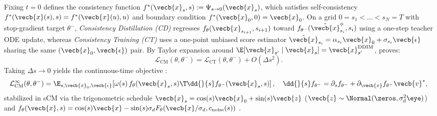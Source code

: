\documentclass[../../../../master.tex]{subfiles}
\begin{document}
\begin{coremath}
Fixing $t=0$ defines the consistency function $f^*(\vecb{x}_s, s) := \Psi_{s\to 0}(\vecb{x}_s)$, which satisfies self-consistency $f^*(\vecb{x}(s), s) = f^*(\vecb{x}(u), u)$ and boundary condition $f^*(\vecb{x}_0, 0) = \vecb{x}_0$. On a grid $0 = s_1 < \dots < s_N = T$ with stop-gradient target $\theta^-$, \emph{Consistency Distillation (CD)} regresses $f_\theta(\vecb{x}_{s_{i+1}}, s_{i+1})$ toward $f_{\theta^-}(\tilde{\vecb{x}}^\phi_{s_i}, s_i)$ using a one-step teacher ODE update, whereas \emph{Consistency Training (CT)} uses a one-point unbiased score estimator $\tilde{\vecb{x}}_{s_i} = \alpha_{s_i}\vecb{x}_0 + \sigma_{s_i}\vecb{\epsilon}$ sharing the same $(\vecb{x}_0, \vecb{\epsilon})$ pair. By Taylor expansion around $\E[\vecb{x}_{s'} \mid \vecb{x}_s] = \vecb{x}_{s'}^{\mathrm{DDIM}}$,  proves:
\begin{equation}
  \label{eq:dsolver:cm_ct_equiv}
  \mathcal{L}_{\mathrm{CM}}(\theta, \theta^-) = \mathcal{L}_{\mathrm{CT}}(\theta, \theta^-) + O(\Delta s^2).
\end{equation}
Taking $\Delta s \to 0$ yields the continuous-time objective :
\begin{equation}
  \label{eq:dsolver:cm_cont}
  \mathcal{L}_{\mathrm{CM}}^\infty(\theta, \theta^-) = \E_{s, \vecb{x}_0, \vecb{\epsilon}}\!\left[\omega(s)\, f_\theta(\vecb{x}_s, s)\T \dd{}{s}f_{\theta^-}(\vecb{x}_s, s)\right],
  \quad \dd{}{s}f_{\theta^-} = \partial_s f_{\theta^-} + \partial_{\vecb{x}} f_{\theta^-} \vecb{v}^*,
\end{equation}
stabilized in sCM via the trigonometric schedule $\vecb{x}_s = \cos(s)\vecb{x}_0 + \sin(s)\vecb{z}$ ($\vecb{z} \sim \Normal(\zeros, \sigma_d^2\eye)$) and $f_\theta(\vecb{x}, s) = \cos(s)\vecb{x} - \sin(s)\sigma_d F_\theta(\vecb{x}/\sigma_d, c_{\mathrm{noise}}(s))$ .
\end{coremath}
\end{document}
